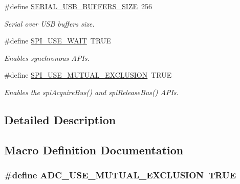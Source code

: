 \begin{DoxyCompactItemize}
\#define \hyperlink{group__HAL__CONF_ga24727a5407c6a41af53b59588592da80}{S\+E\+R\+I\+A\+L\+\_\+\+U\+S\+B\+\_\+\+B\+U\+F\+F\+E\+R\+S\+\_\+\+S\+I\+Z\+E}~256
\begin{DoxyCompactList}\small\item\em Serial over U\+S\+B buffers size. \end{DoxyCompactList}\item 
\#define \hyperlink{group__HAL__CONF_ga0c9ab1488423fa10a22f506c6e74b563}{S\+P\+I\+\_\+\+U\+S\+E\+\_\+\+W\+A\+I\+T}~T\+R\+U\+E
\begin{DoxyCompactList}\small\item\em Enables synchronous A\+P\+Is. \end{DoxyCompactList}\item 
\#define \hyperlink{group__HAL__CONF_ga36d1818f9631f955f7cc94629b1d5498}{S\+P\+I\+\_\+\+U\+S\+E\+\_\+\+M\+U\+T\+U\+A\+L\+\_\+\+E\+X\+C\+L\+U\+S\+I\+O\+N}~T\+R\+U\+E
\begin{DoxyCompactList}\small\item\em Enables the {\ttfamily spi\+Acquire\+Bus()} and {\ttfamily spi\+Release\+Bus()} A\+P\+Is. \end{DoxyCompactList}\end{DoxyCompactItemize}


\subsection{Detailed Description}


\subsection{Macro Definition Documentation}
\hypertarget{group__HAL__CONF_gac0893cb47e338c2dabad34b974a0a88d}{
\subsubsection[{A\+D\+C\+\_\+\+U\+S\+E\+\_\+\+M\+U\+T\+U\+A\+L\+\_\+\+E\+X\+C\+L\+U\+S\+I\+O\+N}]{\setlength{\rightskip}{0pt plus 5cm}\#define A\+D\+C\+\_\+\+U\+S\+E\+\_\+\+M\+U\+T\+U\+A\+L\+\_\+\+E\+X\+C\+L\+U\+S\+I\+O\+N~T\+R\+U\+E}}\label{group__HAL__CONF_gac0893cb47e338c2dabad34b974a0a88d}


